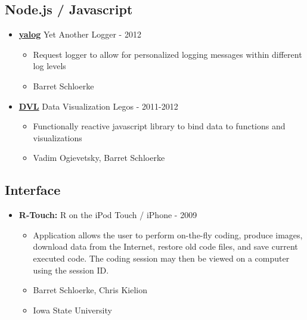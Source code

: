 \documentclass[oneside]{article}
\begin{document}
  \subsection{Node.js / Javascript}

    \begin{itemize}
      \item {\bf \href{http://github.com/schloerke/yalog}{yalog}} Yet Another Logger - 2012
        \begin{itemize}
          \item Request logger to allow for personalized logging messages within different log levels
          \item Barret Schloerke
        \end{itemize}
    \end{itemize}

    \begin{itemize}
      \item {\bf \href{http://github.com/vogievetsky/DVL}{DVL}} Data Visualization Legos - 2011-2012
        \begin{itemize}
          \item Functionally reactive javascript library to bind data to functions and visualizations
          \item Vadim Ogievetsky, Barret Schloerke
        \end{itemize}
    \end{itemize}

  \subsection{Interface}
    \begin{itemize}
      \item{\bf R-Touch:}  R on the iPod Touch / iPhone - 2009
      \begin{itemize}
        \item Application allows the user to perform on-the-fly coding, produce images, download data from the Internet, restore old code files, and save current executed code.  The coding session may then be viewed on a computer using the session ID.
        \item Barret Schloerke, Chris Kielion
        \item Iowa State University
      \end{itemize}


    \end{itemize}
\end{document}
